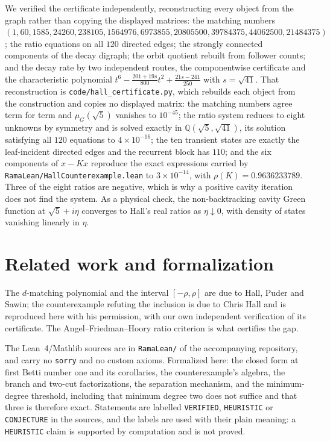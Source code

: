 \documentclass[11pt]{article}
\theoremstyle{remark}
\begin{document}
We verified the certificate independently, reconstructing every object from the graph
rather than copying the displayed matrices: the matching numbers
$(1,60,1585,24260,238105,1564976,6973855,20805500,39784375,44062500,21484375)$; the ratio
equations on all $120$ directed edges; the strongly connected components of the decay
digraph; the orbit quotient rebuilt from follower counts; and the decay rate by two
independent routes, the componentwise certificate and the characteristic polynomial
$t^6-\tfrac{201+19s}{800}t^2+\tfrac{21s-241}{250}$ with $s=\sqrt{41}$. That reconstruction is
\texttt{code/hall\_certificate.py}, which rebuilds each object from the construction and copies no
displayed matrix: the matching numbers agree term for term and $\mu_G(\sqrt5)$ vanishes to
$10^{-45}$; the ratio system reduces to eight unknowns by symmetry and is solved exactly in
$\mathbb Q(\sqrt5,\sqrt{41})$, its solution satisfying all $120$ equations to $4\times10^{-16}$;
the ten transient states are exactly the leaf-incident directed edges and the recurrent block has
$110$; and the six components of $x-Kx$ reproduce the exact expressions carried by
\texttt{RamaLean/HallCounterexample.lean} to $3\times10^{-14}$, with $\rho(K)=0.9636233789$. Three
of the eight ratios are negative, which is why a positive cavity iteration does not find the
system. As a physical check,
the non-backtracking cavity Green function at $\sqrt5+i\eta$ converges to Hall's real
ratios as $\eta\downarrow0$, with density of states vanishing linearly in $\eta$.



\section{Related work and formalization}

The $d$-matching polynomial and the interval $[-\rho,\rho]$ are due to Hall, Puder and Sawin; the
counterexample refuting the inclusion is due to Chris Hall \cite{HallCE} and is reproduced here
with his permission, with our own independent verification of its certificate. The
Angel--Friedman--Hoory ratio criterion \cite{AFH} is what certifies the gap.

The Lean~4/Mathlib sources are in \texttt{RamaLean/} of the accompanying repository, and carry no
\texttt{sorry} and no custom axioms. Formalized here: the closed form at first Betti number one
and its corollaries, the counterexample's algebra, the branch and two-cut factorizations, the
separation mechanism, and the minimum-degree threshold, including that minimum degree two does
not suffice and that three is therefore exact. Statements are labelled \texttt{VERIFIED},
\texttt{HEURISTIC} or \texttt{CONJECTURE} in the sources, and the labels are used with their
plain meaning: a \texttt{HEURISTIC} claim is supported by computation and is not proved.
\end{document}
